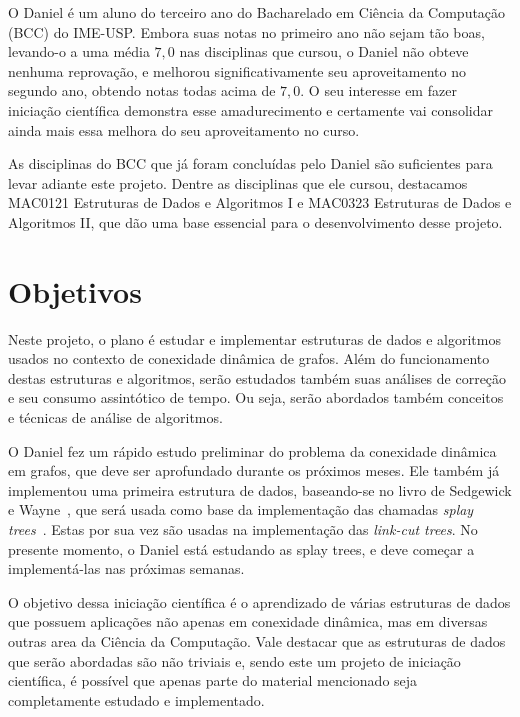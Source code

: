 \documentclass[12pt]{article}
\begin{document}

O Daniel é um aluno do terceiro ano do Bacharelado em Ciência da Computação (BCC) 
do IME-USP. Embora suas notas no primeiro ano não sejam tão boas, levando-o a 
uma média $7{,}0$ nas disciplinas que cursou, o Daniel não obteve nenhuma reprovação, 
e melhorou significativamente seu aproveitamento no segundo ano, obtendo notas todas
acima de $7{,}0$.  O seu interesse em fazer iniciação científica demonstra esse 
amadurecimento e certamente vai consolidar ainda mais essa melhora do seu 
aproveitamento no curso. 

As disciplinas do BCC que já foram concluídas pelo Daniel são suficientes 
para levar adiante este projeto.  Dentre as disciplinas que ele cursou, 
destacamos {\small\sc MAC0121 Estruturas de Dados e Algoritmos I} e 
{\small\sc MAC0323 Estruturas de Dados e Algoritmos II}, que dão 
uma base essencial para o desenvolvimento desse projeto. 

\section{Objetivos}

Neste projeto, o plano é estudar e implementar estruturas de dados e algoritmos
usados no contexto de conexidade dinâmica de grafos.  Além do funcionamento destas 
estruturas e algoritmos, serão estudados também suas análises de correção e seu 
consumo assintótico de tempo.  Ou seja, serão abordados também conceitos e técnicas
de análise de algoritmos. 

O Daniel fez um rápido estudo preliminar do problema da conexidade dinâmica em grafos, 
que deve ser aprofundado durante os próximos meses. Ele também já implementou uma 
primeira estrutura de dados, baseando-se no livro de Sedgewick e Wayne~\cite{SedgewickW2011},
que será usada como base da implementação das chamadas \emph{splay trees}~\cite{SleatorT1985}. 
Estas por sua vez são usadas na implementação das \emph{link-cut trees}. 
No presente momento, o Daniel está estudando as splay trees, e deve começar a 
implementá-las nas próximas semanas. 

O objetivo dessa iniciação científica é o aprendizado de várias estruturas de dados 
que possuem aplicações não apenas em conexidade dinâmica, mas em diversas outras 
area da Ciência da Computação.  Vale destacar que as estruturas de dados que serão 
abordadas são não triviais e, sendo este um projeto de iniciação científica, é 
possível que apenas parte do material mencionado seja completamente estudado e
implementado. 
\end{document}
